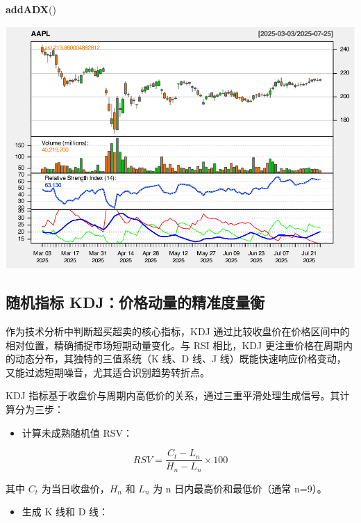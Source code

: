 \documentclass[]{ctexbook}
\newenvironment{Shaded}{\begin{snugshade}}{\end{snugshade}}
\newcommand{\FunctionTok}[1]{\textcolor[rgb]{0.13,0.29,0.53}{\textbf{#1}}}
\newcommand{\NormalTok}[1]{#1}
\providecommand{\tightlist}{%
  \setlength{\itemsep}{0pt}\setlength{\parskip}{0pt}}
\begin{document}
\begin{Shaded}
\begin{Highlighting}[]
\FunctionTok{addADX}\NormalTok{()}
\end{Highlighting}
\end{Shaded}

\includegraphics[width=0.9\linewidth]{QuantmodHandbook_files/figure-latex/rsi_2-3}

\subsection{随机指标 KDJ：价格动量的精准度量衡}\label{ux968fux673aux6307ux6807-kdjux4ef7ux683cux52a8ux91cfux7684ux7cbeux51c6ux5ea6ux91cfux8861}

作为技术分析中判断超买超卖的核心指标，KDJ 通过比较收盘价在价格区间中的相对位置，精确捕捉市场短期动量变化。与 RSI 相比，KDJ 更注重价格在周期内的动态分布，其独特的三值系统（K 线、D 线、J 线）既能快速响应价格变动，又能过滤短期噪音，尤其适合识别趋势转折点。

KDJ 指标基于收盘价与周期内高低价的关系，通过三重平滑处理生成信号。其计算分为三步：

\begin{itemize}
\tightlist
\item
  计算未成熟随机值 RSV：
\end{itemize}

\[
RSV = \frac{C_t - L_n}{H_n - L_n} \times 100
\]

其中 \(C_t\) 为当日收盘价，\(H_n\) 和 \(L_n\) 为 n 日内最高价和最低价（通常 n=9）。

\begin{itemize}
\tightlist
\item
  生成 K 线和 D 线：
\end{itemize}
\end{document}
